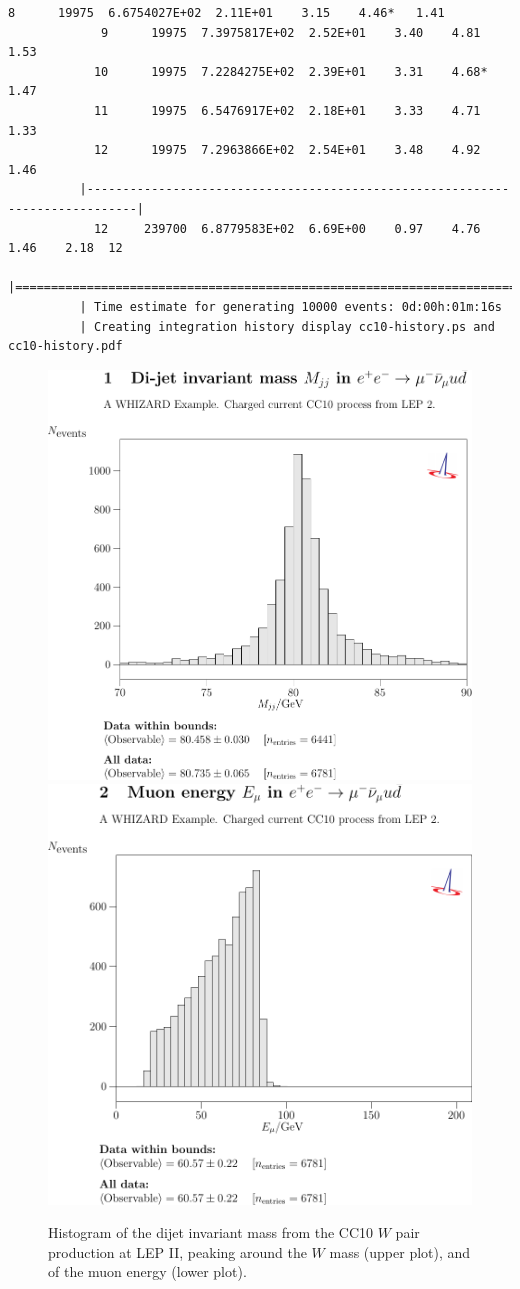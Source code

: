 \documentclass[12pt]{book}
\begin{document}
\begin{scriptsize}
\begin{Verbatim}[frame=single]
             8      19975  6.6754027E+02  2.11E+01    3.15    4.46*   1.41
             9      19975  7.3975817E+02  2.52E+01    3.40    4.81    1.53
            10      19975  7.2284275E+02  2.39E+01    3.31    4.68*   1.47
            11      19975  6.5476917E+02  2.18E+01    3.33    4.71    1.33
            12      19975  7.2963866E+02  2.54E+01    3.48    4.92    1.46
          |-----------------------------------------------------------------------------|
            12     239700  6.8779583E+02  6.69E+00    0.97    4.76    1.46    2.18  12
          |=============================================================================|
          | Time estimate for generating 10000 events: 0d:00h:01m:16s
          | Creating integration history display cc10-history.ps and cc10-history.pdf
\end{Verbatim}
\end{scriptsize}
\begin{figure}
  \centering
  \includegraphics[width=.6\textwidth]{cc10_1}
  \\\vspace{5mm}
  \includegraphics[width=.6\textwidth]{cc10_2}
  \caption{Histogram of the dijet invariant mass from the CC10 $W$
    pair production at LEP II, peaking around the $W$ mass (upper
    plot), and of the muon energy (lower plot).}
  \label{fig:cc10}
\end{figure}
\end{document}
